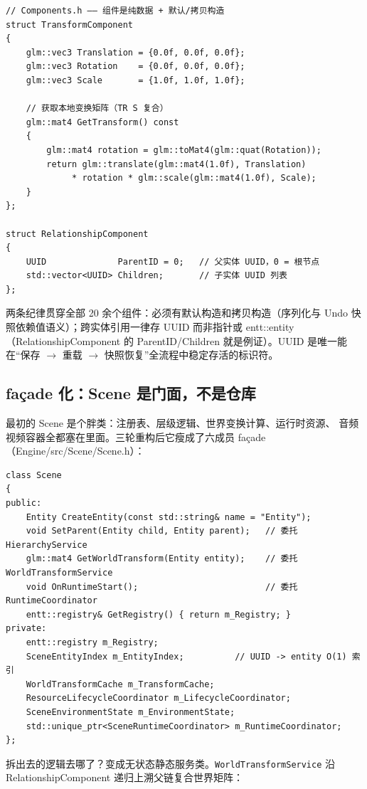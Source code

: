 \begin{lstlisting}
// Components.h —— 组件是纯数据 + 默认/拷贝构造
struct TransformComponent
{
    glm::vec3 Translation = {0.0f, 0.0f, 0.0f};
    glm::vec3 Rotation    = {0.0f, 0.0f, 0.0f};
    glm::vec3 Scale       = {1.0f, 1.0f, 1.0f};

    // 获取本地变换矩阵（TR S 复合）
    glm::mat4 GetTransform() const
    {
        glm::mat4 rotation = glm::toMat4(glm::quat(Rotation));
        return glm::translate(glm::mat4(1.0f), Translation)
             * rotation * glm::scale(glm::mat4(1.0f), Scale);
    }
};

struct RelationshipComponent
{
    UUID              ParentID = 0;   // 父实体 UUID，0 = 根节点
    std::vector<UUID> Children;       // 子实体 UUID 列表
};
\end{lstlisting}

两条纪律贯穿全部 20 余个组件：必须有默认构造和拷贝构造（序列化与 Undo
快照依赖值语义）；跨实体引用一律存 UUID 而非指针或 entt::entity
（RelationshipComponent 的 ParentID/Children 就是例证）。UUID 是唯一能
在``保存 $\to$ 重载 $\to$ 快照恢复''全流程中稳定存活的标识符。

\subsection{façade 化：Scene 是门面，不是仓库}

最初的 Scene 是个胖类：注册表、层级逻辑、世界变换计算、运行时资源、
音频视频容器全都塞在里面。三轮重构后它瘦成了六成员 façade
（Engine/src/Scene/Scene.h）：

\begin{lstlisting}
class Scene
{
public:
    Entity CreateEntity(const std::string& name = "Entity");
    void SetParent(Entity child, Entity parent);   // 委托 HierarchyService
    glm::mat4 GetWorldTransform(Entity entity);    // 委托 WorldTransformService
    void OnRuntimeStart();                         // 委托 RuntimeCoordinator
    entt::registry& GetRegistry() { return m_Registry; }
private:
    entt::registry m_Registry;
    SceneEntityIndex m_EntityIndex;          // UUID -> entity O(1) 索引
    WorldTransformCache m_TransformCache;
    ResourceLifecycleCoordinator m_LifecycleCoordinator;
    SceneEnvironmentState m_EnvironmentState;
    std::unique_ptr<SceneRuntimeCoordinator> m_RuntimeCoordinator;
};
\end{lstlisting}

拆出去的逻辑去哪了？变成无状态静态服务类。\texttt{WorldTransformService}
沿 RelationshipComponent 递归上溯父链复合世界矩阵：


